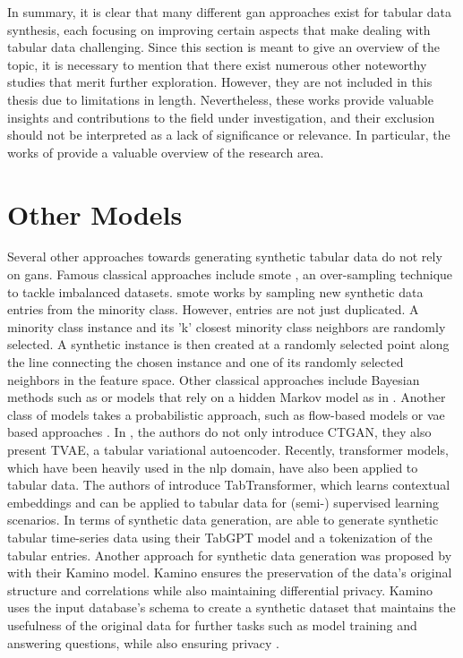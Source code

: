 In summary, it is clear that many different \gls{gan} approaches exist for tabular data synthesis, each focusing on improving certain aspects that make dealing with tabular data challenging.
Since this section is meant to give an overview of the topic, 
it is necessary to mention that there exist numerous other noteworthy studies that merit further exploration. 
However, they are not included in this thesis due to limitations in length. 
Nevertheless, these works provide valuable insights and contributions to the field under investigation, and their exclusion should not be interpreted as a lack of significance or relevance. 
In particular, the works of \textcite{fan2020RelationalDataSynthesisa, hernandez2022SyntheticDataGeneration, bourou2021ReviewTabularData} provide a valuable overview of the research area.


\section{Other Models}
\label{ch:relatedWork-Other Models}

Several other approaches towards generating synthetic tabular data do not rely on \glspl{gan}.
Famous classical approaches include \gls{smote} \cite{chawla2002SMOTESyntheticMinority}, an over-sampling technique to tackle imbalanced datasets.
\gls{smote} works by sampling new synthetic data entries from the minority class.
However, entries are not just duplicated.
A minority class instance and its 'k' closest minority class neighbors are randomly selected. 
A synthetic instance is then created at a randomly selected point along the line connecting the chosen instance and one of its randomly selected neighbors in the feature space.
Other classical approaches include Bayesian methods such as \cite{zhang2017PrivBayesPrivateData} or models that rely on a hidden Markov model as in \cite{dahmen2019SynSysSyntheticData}.
Another class of models takes a probabilistic approach, such as flow-based models \cite{kamthe2021CopulaFlowsSynthetic} or \gls{vae} based approaches \cite{kingma2013AutoEncodingVariationalBayes}.
In \cite{xu2019ModelingTabularData}, the authors do not only introduce CTGAN, they also present TVAE, a tabular variational autoencoder.
Recently, transformer models, which have been heavily used in the \gls{nlp} domain, have also been applied to tabular data.
The authors of \cite{huang2020TabTransformerTabularData} introduce TabTransformer, which learns contextual embeddings and can be applied to tabular data for (semi-) supervised learning scenarios.
In terms of synthetic data generation, \textcite{padhi2021TabularTransformersModeling} are able to generate synthetic tabular time-series data using their TabGPT model and a tokenization of the tabular entries.
Another approach for synthetic data generation was proposed by \textcite{ge2021KaminoConstraintawareDifferentially} with their Kamino model.
Kamino ensures the preservation of the data's original structure and correlations while also maintaining differential privacy. 
Kamino uses the input database's schema to create a synthetic dataset that maintains the usefulness of the original data for further tasks such as model training and answering questions, while also ensuring privacy \cite{ge2021KaminoConstraintawareDifferentially}.

